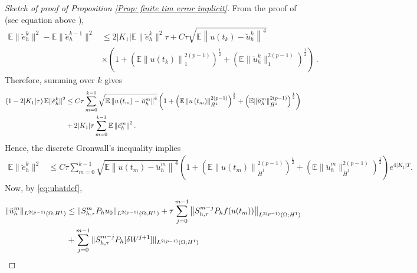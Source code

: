 \documentclass[reqno, 11pt]{amsart}
\newcommand{\gsnote}[1]{\textcolor{Cerulean}{#1}}
\theoremstyle{plain}
\theoremstyle{definition}
\theoremstyle{remark}
\numberwithin{equation}{section}
\numberwithin{theorem}{section}
\begin{document}
{\begin{proof}[Sketch of proof of Proposition \ref{Prop: finite tim error implicit}]
 From the proof of \cite[Theorem 1.1]{liu2021strong} (see equation above \cite[equation (4.27)]{liu2021strong}), 
\begin{equation}
\begin{aligned}
 \mathbb{E}\|\breve{e}_h^{k}\|^2-\mathbb{E}\|\breve{e}_h^{k-1}\|^2 
 &\leq 2|K_1| \mathbb{E}\|\breve{e}_h^{k}\|^2 \tau+C\tau\sqrt{\mathbb{E}\left\|u\left(t_{k}\right)-\breve{u}_h^{k}\right\|^4} \\
&  \times\left(1+\left(\mathbb{E}\left\|u\left(t_{k}\right)\right\|_1^{2(p-1)}\right)^{\frac{1}{2}}+\left(\mathbb{E}\|\breve{u}_h^{k}\|_1^{2(p-1)}\right)^{\frac{1}{2}}\right)\,.
\end{aligned}
\end{equation}
Therefore, summing over $k$ gives
\begin{align}
\left(1-2 |K_1| \tau\right) \mathbb{E}\|\breve{e}_h^k\|^2 &\leq C\tau\sum\limits_{m=0}^{k-1}\sqrt{\mathbb{E}\left\|u\left(t_{m}\right)-\breve{u}_h^{m}\right\|^4}\left(1+\left(\mathbb{E}\left\|u\left(t_{m}\right)\right\|_{\dot{H}^1}^{2(p-1)}\right)^{\frac{1}{2}}+\left(\mathbb{E}\|\breve{u}_h^{m}\|_{\dot{H}^1}^{2(p-1)}\right)^{\frac{1}{2}}\right)\notag\\
&+2 |K_1| \tau \sum_{m=0}^{k-1} \mathbb{E}\left\|\breve{e}_h^m\right\|^2.\notag
\end{align}
Hence, the discrete Gronwall's inequality implies
\begin{align}\label{eq:ehat}
\mathbb{E}\|\breve{e}_h^k\|^2&\leq C\tau\sum\limits_{m=0}^{k-1}\sqrt{\mathbb{E}\left\|u\left(t_{m}\right)-\breve{u}_h^{m}\right\|^4}\left(1+\left(\mathbb{E}\left\|u\left(t_{m}\right)\right\|_{\dot{H}^1}^{2(p-1)}\right)^{\frac{1}{2}}+\left(\mathbb{E}\|\breve{u}_h^{m}\|_{\dot{H}^1}^{2(p-1)}\right)^{\frac{1}{2}}\right)e^{4|K_1|T}. 
\end{align}
Now, by \eqref{eq:uhatdef},
\begin{align}\label{eq:stabuhat}
\|\breve{u}_h^{m}\|_{L^{2(p-1)}(\Omega;H^1)}&\leq \|S_{h,\tau}^{m}P_hu_0\|_{L^{2(p-1)}(\Omega;H^1)}+\tau\sum\limits_{j=0}^{m-1}\big\|S_{h,\tau}^{m-j}P_hf(u(t_{m}))\big\|_{L^{2(p-1)}(\Omega;H^1)}\\
&+\sum\limits_{j=0}^{m-1} \|S_{h,\tau}^{m-j}P_h[\delta W^{j+1}] \|_{L^{2(p-1)}(\Omega;H^1)}\notag\\

\end{align}
\end{proof}}
\end{document}
